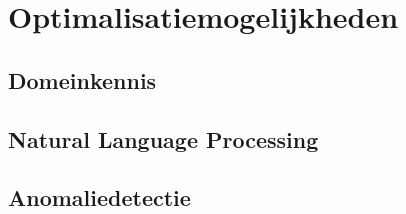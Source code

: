
\chapter{Optimalisatiemogelijkheden}
\label{ch:optimalisatiemogelijkheden}


\section{Domeinkennis}
\label{sec:domeinkennis}



\section{Natural Language Processing}
\label{sec:natural-language-processing}



\section{Anomaliedetectie}
\label{sec:anomaliedetectie}

